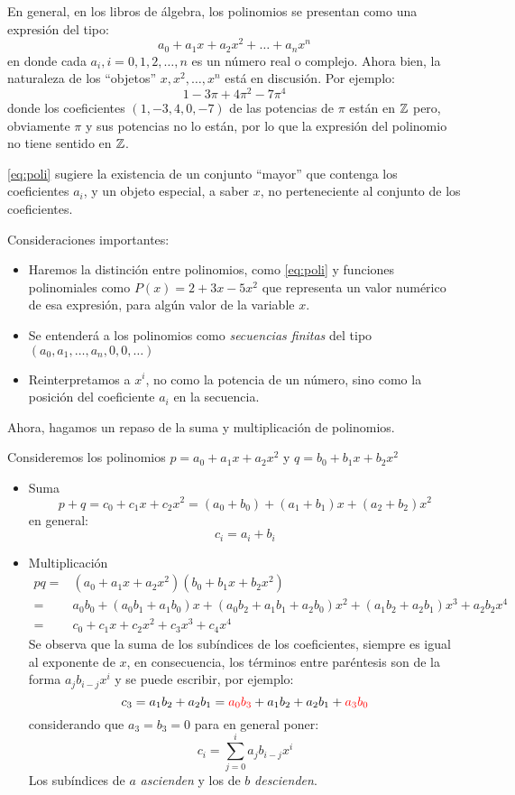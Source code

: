En general, en los libros de álgebra, los polinomios se presentan como una expresión del tipo:
\begin{equation} \label{eq:poli}
	a_0 + a_1 x + a_2 x^2 + \dots + a_nx^n
\end{equation}
en donde cada $a_i, i = 0, 1, 2, \dots, n$ es un número real o complejo. Ahora bien, la naturaleza de los ``objetos'' $x, x^2, \dots, x^n$ está en discusión. Por ejemplo:
\[ 1 - 3 \pi + 4\pi^2 - 7\pi^4 \]
donde los coeficientes $(1, -3, 4, 0, -7)$ de las potencias de $\pi$ están en $\mathbb{Z}$ pero, obviamente $\pi$ y sus potencias no lo están, por lo que la expresión del polinomio no tiene sentido en $\mathbb{Z}$.

\eqref{eq:poli} sugiere la existencia de un conjunto ``mayor'' que contenga los coeficientes $a_i$, y un objeto especial, a saber $x$, no perteneciente al conjunto de los coeficientes.

Consideraciones importantes:
\begin{itemize}
	\item Haremos la distinción entre polinomios, como \eqref{eq:poli} y funciones polinomiales como $P(x) = 2 + 3x -5x^2$ que representa un valor numérico de esa expresión, para algún valor de la variable $x$.
	\item Se entenderá a los polinomios como \textit{secuencias finitas} del tipo $(a_0, a_1, \dots, a_n, 0, 0, \dots)$
	\item Reinterpretamos a $x^i$, no como la potencia de un número, sino como la posición del coeficiente $a_i$ en la secuencia.
\end{itemize}

Ahora, hagamos un repaso de la suma y multiplicación de polinomios.

\begin{fmd-example}
	Consideremos los polinomios $p = a_0 + a_1x + a_2x^2$ y $q = b_0 + b_1x + b_2x^2$
	
	\begin{itemize}
		\item Suma
		\[ p + q = c_0 + c_1x + c_2x^2 = (a_0 + b_0) + (a_1 + b_1)x + (a_2 + b_2)x^2\]
		en general: \[ c_i = a_i + b_i \]
		\item Multiplicación
		\[ \begin{split}
			pq =& (a_0 + a_1x + a_2x^2)(b_0 + b_1x + b_2x^2)\\
			=& a_0b_0 + (a_0b_1 + a_1b_0)x + (a_0b_2 + a_1b_1 + a_2b_0)x^2 + (a_1b_2 + a_2b_1)x^3 + a_2b_2x^4\\
			=& c_0 + c_1x + c_2x^2 + c_3x^3 + c_4x^4
			\end{split} \]
			Se observa que la suma de los subíndices de los coeficientes, siempre es igual al exponente de $x$, en consecuencia, los términos entre paréntesis son de la forma $a_jb_{i-j}x^{i}$ y se puede escribir, por ejemplo:
			\[ c_3 = a_1b_2 + a_2b_1 = {\color{red} a_0b_3} + a_1b_2 + a_2b_1 + {\color{red} a_3b_0} \]
			considerando que $a_3 = b_3 = 0$ para en general poner:
			\[ c_i = \sum_{j=0}^{i} a_jb_{i-j}x^{i}\]
			Los subíndices de $a$ \textit{ascienden} y los de $b$ \textit{descienden}.
	\end{itemize}
\end{fmd-example}

